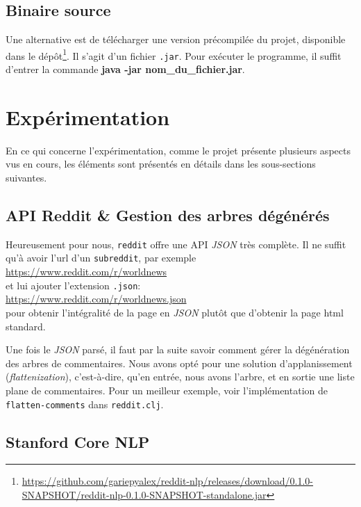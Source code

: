 \documentclass[12pt]{article}
\begin{document}
\subsection{Binaire source}
Une alternative est de télécharger une version précompilée du projet, disponible dans le dépôt\footnote{\url{https://github.com/gariepyalex/reddit-nlp/releases/download/0.1.0-SNAPSHOT/reddit-nlp-0.1.0-SNAPSHOT-standalone.jar}}. Il s'agit d'un fichier \verb;.jar;. Pour exécuter le programme, il
suffit d'entrer la commande \textbf{java -jar nom\_du\_fichier.jar}.

\section{Expérimentation}

En ce qui concerne l'expérimentation, comme le projet présente plusieurs aspects vus en cours, les éléments sont présentés en détails dans les sous-sections suivantes.

\subsection{API Reddit \& Gestion des arbres dégénérés}
\label{sec:api-reddit}

Heureusement pour nous, \verb;reddit; offre une API \textit{JSON} très complète. Il ne suffit qu'à avoir l'url d'un \verb;subreddit;, par exemple\\

\url{https://www.reddit.com/r/worldnews}\\

et lui ajouter l'extension \verb;.json;:\\

\url{https://www.reddit.com/r/worldnews.json}\\

pour obtenir l'intégralité de la page en \textit{JSON} plutôt que d'obtenir la page html standard.

Une fois le \textit{JSON} parsé, il faut par la suite savoir comment gérer la dégénération des arbres de commentaires. Nous avons opté pour une solution d'applanissement (\textit{flattenization}), c'est-à-dire, qu'en entrée, nous avons l'arbre, et en sortie une liste plane de commentaires. Pour un meilleur exemple, voir l'implémentation de \verb;flatten-comments; dans \verb;reddit.clj;.

\subsection{Stanford Core NLP}
\end{document}
